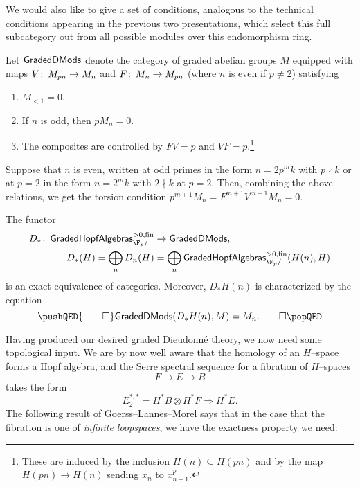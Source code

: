 We would also like to give a set of conditions, analogous to the technical conditions appearing in the previous two presentations, which select this full subcategory out from all possible modules over this endomorphism ring.

\begin{definition}
Let $\mathsf{GradedDMods}$ denote the category of graded abelian groups $M$ equipped with maps $V\colon\thinspace M_{pn} \to M_n$ and $F\colon\thinspace M_n \to M_{pn}$ (where $n$ is even if $p \ne 2$) satisfying
\begin{enumerate}
\item $M_{< 1} = 0$.
\item If $n$ is odd, then $pM_n = 0$.
\item The composites are controlled by $FV = p$ and $VF = p$.\footnote{These are induced by the inclusion $H(n) \subseteq H(pn)$ and by the map $H(pn) \to H(n)$ sending $x_n$ to $x_{n-1}^p$.}
\end{enumerate}
\end{definition}

\begin{remark}
Suppose that $n$ is even, written at odd primes in the form $n = 2p^m k$ with $p \nmid k$ or at $p = 2$ in the form $n = 2^m k$ with $2 \nmid k$ at $p = 2$.  Then, combining the above relations, we get the torsion condition $p^{m+1} M_n = F^{m+1} V^{m+1} M_n = 0$.
\end{remark}

\begin{theorem}
The functor
\begin{align*}
D_*\co \CatOf{GradedHopfAlgebras}^{>0, \fin}_{\F_p/} & \to \CatOf{GradedDMods}, \\
D_*(H) = \bigoplus_n D_n(H) & = \bigoplus_n \CatOf{GradedHopfAlgebras}^{>0, \fin}_{\F_p/}(H(n), H)
\end{align*}
is an exact equivalence of categories.  Moreover, $D_* H(n)$ is characterized by the equation
\[\pushQED{\qed}
\CatOf{GradedDMods}(D_* H(n), M) = M_n. \qedhere
\popQED\]
\end{theorem}

Having produced our desired graded Dieudonn\'e theory, we now need some topological input.  We are by now well aware that the homology of an $H$--space forms a Hopf algebra, and the Serre spectral sequence for a fibration of $H$--spaces \[F \to E \to B\] takes the form \[E_2^{*, *} = H^* B \otimes H^* F \Rightarrow H^* E.\]  The following result of Goerss--Lannes--Morel says that in the case that the fibration is one of \emph{infinite loopspaces}, we have the exactness property we need:

